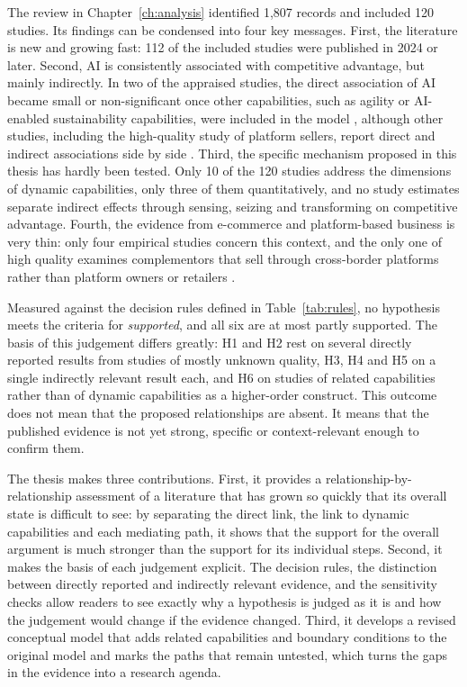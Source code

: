 The review in Chapter~\ref{ch:analysis} identified 1,807 records and included 120 studies. Its findings can be condensed into four key messages. First, the literature is new and growing fast: 112 of the included studies were published in 2024 or later. Second, AI is consistently associated with competitive advantage, but mainly indirectly. In two of the appraised studies, the direct association of AI became small or non-significant once other capabilities, such as agility or AI-enabled sustainability capabilities, were included in the model \parencite{srahin2026, texeira2026}, although other studies, including the high-quality study of platform sellers, report direct and indirect associations side by side \parencite{guo2025}. Third, the specific mechanism proposed in this thesis has hardly been tested. Only 10 of the 120 studies address the dimensions of dynamic capabilities, only three of them quantitatively, and no study estimates separate indirect effects through sensing, seizing and transforming on competitive advantage. Fourth, the evidence from e-commerce and platform-based business is very thin: only four empirical studies concern this context, and the only one of high quality examines complementors that sell through cross-border platforms rather than platform owners or retailers \parencite{guo2025}.

Measured against the decision rules defined in Table~\ref{tab:rules}, no hypothesis meets the criteria for \textit{supported}, and all six are at most partly supported. The basis of this judgement differs greatly: H1 and H2 rest on several directly reported results from studies of mostly unknown quality, H3, H4 and H5 on a single indirectly relevant result each, and H6 on studies of related capabilities rather than of dynamic capabilities as a higher-order construct. This outcome does not mean that the proposed relationships are absent. It means that the published evidence is not yet strong, specific or context-relevant enough to confirm them.

The thesis makes three contributions. First, it provides a relationship-by-relationship assessment of a literature that has grown so quickly that its overall state is difficult to see: by separating the direct link, the link to dynamic capabilities and each mediating path, it shows that the support for the overall argument is much stronger than the support for its individual steps. Second, it makes the basis of each judgement explicit. The decision rules, the distinction between directly reported and indirectly relevant evidence, and the sensitivity checks allow readers to see exactly why a hypothesis is judged as it is and how the judgement would change if the evidence changed. Third, it develops a revised conceptual model that adds related capabilities and boundary conditions to the original model and marks the paths that remain untested, which turns the gaps in the evidence into a research agenda.

